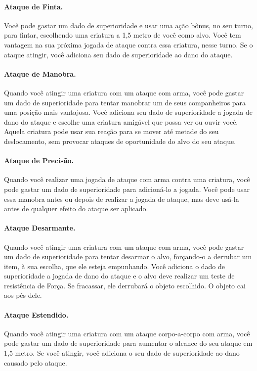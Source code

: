 \begin{multicols}{2}
\paragraph{Ataque de Finta.} Você pode gastar um dado de superioridade e usar
uma ação bônus, no seu turno, para fintar, escolhendo uma criatura a 1,5 metro
de você como alvo. Você tem vantagem na sua próxima jogada de ataque contra essa
criatura, nesse turno. Se o ataque atingir, você adiciona seu dado de
superioridade ao dano do ataque.

\paragraph{Ataque de Manobra.} Quando você atingir uma criatura com um ataque
com arma, você pode gastar um dado de superioridade para tentar manobrar um de
seus companheiros para uma posição mais vantajosa. Você adiciona seu dado de
superioridade a jogada de dano do ataque e escolhe uma criatura amigável que
possa ver ou ouvir você. Aquela criatura pode usar sua reação para se mover até
metade do seu deslocamento, sem provocar ataques de oportunidade do alvo do seu
ataque.

\paragraph{Ataque de Precisão.} Quando você realizar uma jogada de ataque com
arma contra uma criatura, você pode gastar um dado de superioridade para
adicioná-lo a jogada. Você pode usar essa manobra antes ou depois de realizar a
jogada de ataque, mas deve usá-la antes de qualquer efeito do ataque ser
aplicado.

\paragraph{Ataque Desarmante.} Quando você atingir uma criatura com um ataque
com arma, você pode gastar um dado de superioridade para tentar desarmar o alvo,
forçando-o a derrubar um item, à sua escolha, que ele esteja empunhando. Você
adiciona o dado de superioridade a jogada de dano do ataque e o alvo deve
realizar um teste de resistência de Força. Se fracassar, ele derrubará o objeto
escolhido. O objeto cai aos pés dele.

\paragraph{Ataque Estendido.} Quando você atingir uma criatura com um ataque
corpo-a-corpo com arma, você pode gastar um dado de superioridade para aumentar
o alcance do seu ataque em 1,5 metro. Se você atingir, você adiciona o seu dado
de superioridade ao dano causado pelo ataque.


\end{multicols}
